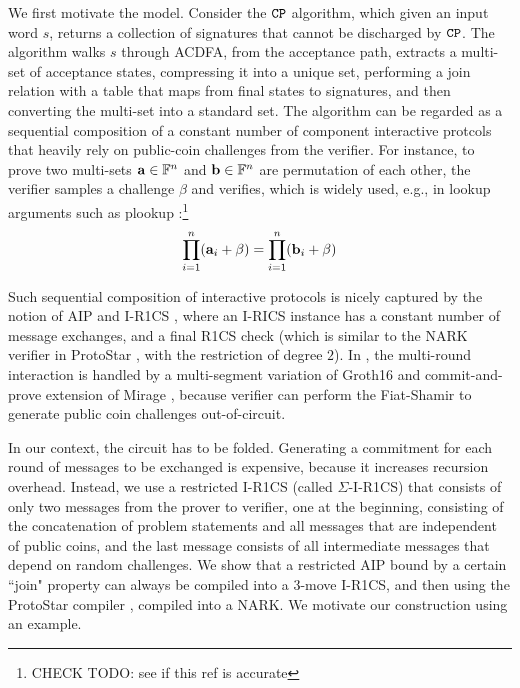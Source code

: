 We first motivate the model. Consider the $\texttt{CP}$ algorithm, which
given an input word $s$, returns a collection of signatures
that cannot be discharged by $\texttt{CP}$. The algorithm walks $s$
through ACDFA, from the acceptance path, extracts
a multi-set of acceptance states, compressing it into
a unique set, performing a join relation with a table that
maps from final states to signatures, and then converting 
the multi-set into a standard set. The algorithm can be
regarded as a sequential composition of a constant number
of component interactive protcols that heavily rely on
public-coin challenges from the verifier. For instance,
to prove two multi-sets ${{\mathbf {a}}} \in \mathbb{F}^n$ and ${{\mathbf {b}}} \in \mathbb{F}^n$ 
are permutation of each other, the verifier samples a challenge
$\beta$ and verifies, which is widely used, e.g., in lookup arguments
such as plookup \cite{plookup}:\footnote{CHECK TODO: see if this
ref is accurate}
\[
	\prod_{i=1}^n ({{\mathbf {a}}}_i + \beta)  =
	\prod_{i=1}^n ({{\mathbf {b}}}_i + \beta) 
\]

Such sequential composition of interactive protocols is
nicely captured by the notion of AIP and I-R1CS \cite{AIPRam},
where an I-RICS instance has a constant number of message
exchanges, and a final R1CS check (which is similar to the
NARK verifier in ProtoStar \cite{ProtoStar}, with the
restriction of degree $2$). 
In \cite{AIPRam}, the multi-round interaction is handled
by a multi-segment variation of Groth16 \cite{Groth16}
and commit-and-prove extension of Mirage \cite{Mirage}, because
verifier can perform the Fiat-Shamir to generate public coin
challenges out-of-circuit.

In our context, the circuit has to be folded. Generating a commitment
for each round of messages to be exchanged is expensive, because
it increases recursion overhead. Instead, we use a 
restricted I-R1CS (called $\Sigma$-I-R1CS) that consists of
only two messages from the prover to verifier, one at
the beginning, consisting of the concatenation of problem statements
and all messages that are independent of public coins, and
the last message consists of all intermediate messages that
depend on random challenges. We show that a restricted AIP bound by
a certain ``join" property can always be
compiled into a 3-move I-R1CS, and then using the 
ProtoStar compiler \cite{ProtoStar}, compiled into a NARK.
We motivate our construction using an example.

